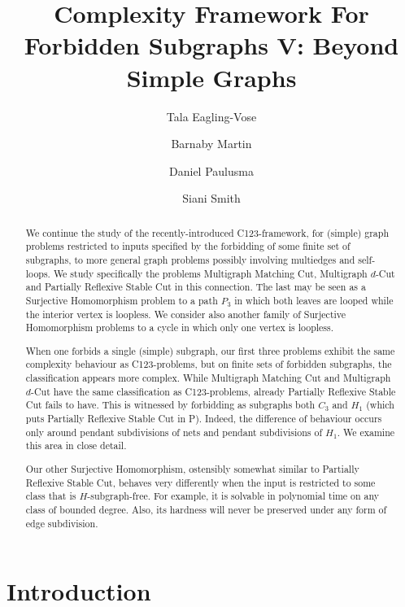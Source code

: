 \documentclass[a4paper,UKenglish,cleveref, autoref,thm-restate]{lipics-v2021}
\title{Complexity Framework For Forbidden Subgraphs V: Beyond Simple Graphs} %
\author{Tala Eagling-Vose}{Department of Computer Science, Durham University, UK}{tala.j.eagling-vose@durham.ac.uk}{https://orcid.org/0009-0008-0346-7032}{}
\author{Barnaby Martin}{Department of Computer Science, Durham University, UK}{barnaby.d.martin@durham.ac.uk}{https://orcid.org/0000-0002-4642-8614}{}
\author{Daniel Paulusma}{Department of Computer Science, Durham University, UK}{daniel.paulusma@durham.ac.uk}{https://orcid.org/0000-0001-5945-9287}{}
\author{Siani Smith}{Department of Computer Science, Loughborough University, UK}{siani.smith@lboro.ac.uk}{https://orcid.org/0000-0003-0797-0512}{}
\begin{document}
\maketitle             




\begin{abstract}
    We continue the study of the recently-introduced C123-framework, for (simple) graph problems restricted to inputs specified by the forbidding of some finite set of subgraphs, to more general graph problems possibly involving multiedges and self-loops. We study specifically the problems {\sc Multigraph Matching Cut}, {\sc Multigraph $d$-Cut} and {\sc Partially Reflexive Stable Cut} in this connection. The last may be seen as a Surjective Homomorphism problem to a path $P_3$ in which both leaves are looped while the interior vertex is loopless. We consider also another family of Surjective Homomorphism problems to a cycle in which only one vertex is loopless.
    
    When one forbids a single (simple) subgraph, our first three problems exhibit the same complexity behaviour as C123-problems, but on finite sets of forbidden subgraphs, the classification appears more complex. While {\sc Multigraph Matching Cut} and {\sc Multigraph $d$-Cut} have the same classification as C123-problems, already {\sc Partially Reflexive Stable Cut} fails to have. This is witnessed by forbidding as subgraphs both $C_3$ and $H_1$ (which puts {\sc Partially Reflexive Stable Cut} in P). Indeed, the difference of behaviour occurs only around pendant subdivisions of nets and pendant subdivisions of $H_1$. We examine this area in close detail.

    Our other Surjective Homomorphism, ostensibly somewhat similar to {\sc Partially Reflexive Stable Cut}, behaves very differently when the input is restricted to some class that is $H$-subgraph-free. For example, it is solvable in polynomial time on any class of bounded degree. Also, its hardness will never be preserved under any form of edge subdivision.
\end{abstract}

\section{Introduction}\label{s-intro}
\end{document}
